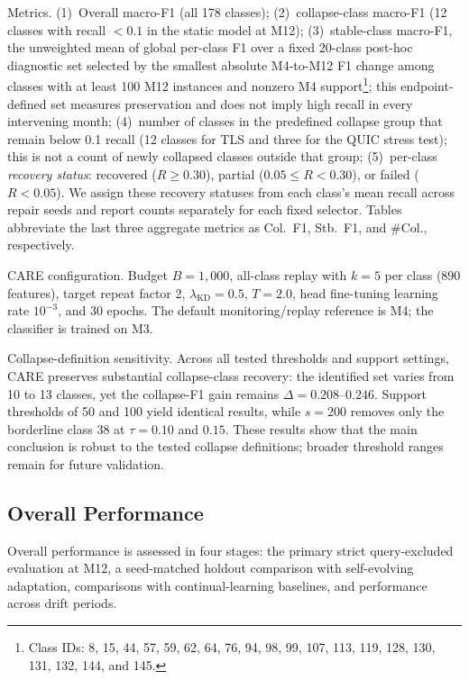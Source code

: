\documentclass[preprint,12pt,authoryear]{elsarticle}
\newcommand{\ours}{CARE}  %
\begin{document}
Metrics.
(1)~Overall macro-F1 (all 178 classes);
(2)~collapse-class macro-F1 (12 classes with recall ${<}0.1$ in the static model at M12);
(3)~stable-class macro-F1, the unweighted mean of global per-class F1 over a fixed 20-class post-hoc diagnostic set selected by the smallest absolute M4-to-M12 F1 change among classes with at least 100 M12 instances and nonzero M4 support\footnote{Class IDs: 8, 15, 44, 57, 59, 62, 64, 76, 94, 98, 99, 107, 113, 119, 128, 130, 131, 132, 144, and 145.}; this endpoint-defined set measures preservation and does not imply high recall in every intervening month;
(4)~number of classes in the predefined collapse group that remain below 0.1 recall (12 classes for TLS and three for the QUIC stress test); this is not a count of newly collapsed classes outside that group;
(5)~per-class \textit{recovery status}: recovered ($R{\geq}0.30$), partial ($0.05{\leq}R{<}0.30$), or failed ($R{<}0.05$). We assign these recovery statuses from each class's mean recall across repair seeds and report counts separately for each fixed selector.
Tables abbreviate the last three aggregate metrics as Col.\ F1, Stb.\ F1, and \#Col., respectively.

\ours{} configuration.
Budget $B{=}1{,}000$, all-class replay with $k{=}5$ per class (890 features), target repeat factor 2, $\lambda_{\text{KD}}{=}0.5$, $T{=}2.0$, head fine-tuning learning rate $10^{-3}$, and 30 epochs. The default monitoring/replay reference is M4; the classifier is trained on M3.

Collapse-definition sensitivity.
Across all tested thresholds and support settings, \ours{} preserves substantial collapse-class recovery: the identified set varies from 10 to 13 classes, yet the collapse-F1 gain remains $\Delta{=}0.208$--$0.246$. Support thresholds of 50 and 100 yield identical results, while $s{=}200$ removes only the borderline class 38 at $\tau{=}0.10$ and $0.15$. These results show that the main conclusion is robust to the tested collapse definitions; broader threshold ranges remain for future validation.

\subsection{Overall Performance}
\label{sec:main_results}

Overall performance is assessed in four stages: the primary strict query-excluded evaluation at M12, a seed-matched holdout comparison with self-evolving adaptation, comparisons with continual-learning baselines, and performance across drift periods.
\end{document}
